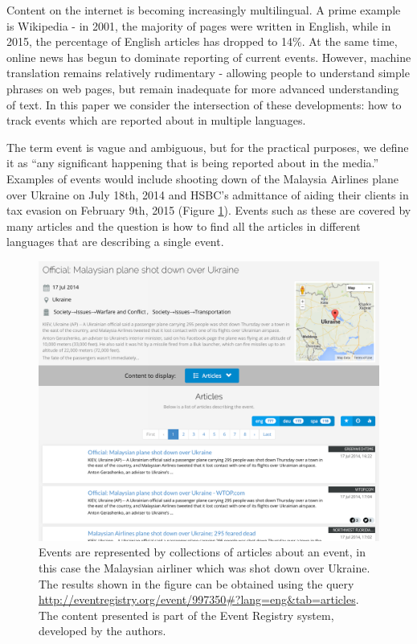 \documentclass[twoside,11pt]{article}
\begin{document}
Content on the internet is becoming increasingly multilingual. A prime example is Wikipedia - in 2001, the majority of pages were written in English, while in 2015, the percentage of English articles has dropped to 14\%. At the same time, online news has begun to dominate reporting of current events. However, machine translation remains relatively rudimentary - allowing people to understand simple phrases on web pages, but remain inadequate for more advanced understanding of text. In this paper we consider the intersection of these developments: how to track events which are reported about in multiple languages.

The term event is vague and ambiguous, but for the practical purposes, we define it as ``any significant happening that is being reported about in the media.'' Examples of events would include shooting down of the Malaysia Airlines plane over Ukraine on July 18th, 2014 and HSBC's admittance of aiding their clients in tax evasion on February 9th, 2015 (Figure \ref{fig:event2}). Events such as these are covered by many articles and the question is how to find all the articles in different languages that are describing a single event.

\begin{figure}
\centering
\includegraphics[width=1\textwidth]{events2.png}
\caption{\label{fig:event2} Events are represented by collections of articles about an event, in this case the Malaysian airliner which was shot down over Ukraine. The results shown in the figure can be obtained using the query \url{http://eventregistry.org/event/997350\#?lang=eng\&tab=articles}. The content presented is part of the Event Registry system, developed by the authors.}
\end{figure}
\end{document}
